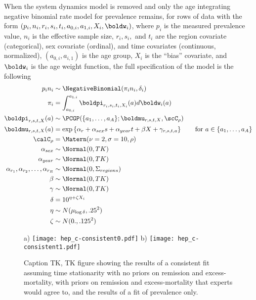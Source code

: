 When the system dynamics model is removed and only the age integrating
negative binomial rate model for prevalence remains, for rows of data
with the form $(p_i, n_i, r_i, s_i, t_i, a_{0,i}, a_{1,i}, X_i,
\boldw_i)$, where $p_i$ is the measured prevalence value, $n_i$ is the
effective sample size, $r_i, s_i,$ and $t_i$ are the region covariate
(categorical), sex covariate (ordinal), and time covariates
(continuous, normalized), $(a_{0,i}, a_{i,1})$ is the age group, $X_i$
is the ``bias'' covariate, and $\boldw_i$ is the age weight function,
the full specification of the model is the following
\begin{align*}
p_i n_i &\sim \NegativeBinomial(\pi_i n_i, \delta_i)\\
\pi_i &= \int_{a_{0,i}}^{a_{1,i}} \boldpi_{r_i,s_i,t_i,X_i}(a)d\boldw_i(a)\\
\boldpi_{r,s,t,X}(a) &\sim \PCGP(\{a_1, \ldots, a_A\}; \boldmu_{r,s,t,X}, \scC_\rho)\\
\boldmu_{r,s,t,X}(a) &= \exp\left\{\alpha_r + \alpha_{sex} s + \alpha_{year} t + 
\beta X + \gamma_{r,s,t,a}\right\} \qquad \text{for }a \in \{a_1, \ldots, a_A\}\\
\calC_\rho &= \Matern(\nu=2, \sigma=10, \rho)\\
\alpha_{sex} &\sim \Normal(0, TK)\\
\alpha_{year} &\sim \Normal(0, TK)\\
\alpha_{r_1}, \alpha_{r_2}, \ldots, \alpha_{r_R} &\sim \Normal(0, \Sigma_{regions})\\
\beta &\sim \Normal(0, TK)\\
\gamma &\sim \Normal(0, TK)\\
\delta &= 10^{\eta + \zeta X_i}\\
\eta &\sim N(\mu_{\log \delta}, .25^2)\\
\zeta &\sim N(0., .125^2)
\end{align*}

\begin{figure}
\begin{center}
a)
\texttt{[image: hep\_c-consistent0.pdf]}
b)
\texttt{[image: hep\_c-consistent1.pdf]}
\end{center}
\caption{Caption TK, TK figure showing the results of a consistent fit
  assuming time stationarity with no priors on remission and
  excess-mortality, with priors on remission and excess-mortality that
  experts would agree to, and the results of a fit of prevalence only.
}
\label{hep_c-consistent}
\end{figure}

